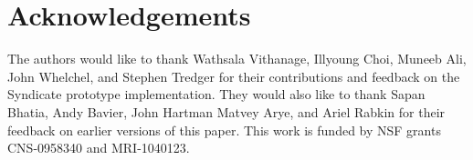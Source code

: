 \section{Acknowledgements}

The authors would like to thank Wathsala Vithanage, Illyoung Choi, Muneeb Ali, 
John Whelchel, and Stephen Tredger for their contributions and feedback on 
the Syndicate prototype implementation.  They would also like to thank Sapan Bhatia, Andy Bavier, John Hartman
Matvey Arye, and Ariel Rabkin for their feedback on earlier versions of this paper.
This work is funded by NSF grants CNS-0958340 and MRI-1040123.